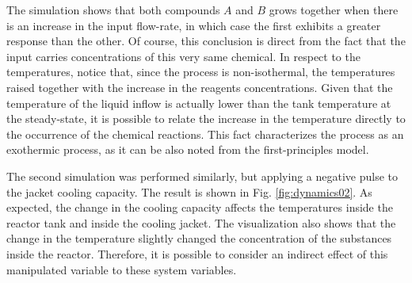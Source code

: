 \documentclass[a4paper,11pt]{book}
\numberwithin{figure}{chapter}
\numberwithin{equation}{chapter}
\numberwithin{table}{chapter}
\theoremstyle{definition}
\begin{document}
The simulation shows that both compounds $A$ and $B$ grows together when there is an increase in the input flow-rate, in which case the first exhibits a greater response than the other. Of course, this conclusion is direct from the fact that the input carries concentrations of this very same chemical. In respect to the temperatures, notice that, since the process is non-isothermal, the temperatures raised together with the increase in the reagents concentrations. Given that the temperature of the liquid inflow is actually lower than the tank temperature at the steady-state, it is possible to relate the increase in the temperature directly to the occurrence of the chemical reactions. This fact characterizes the process as an exothermic process, as it can be also noted from the first-principles model.

The second simulation was performed similarly, but applying a negative pulse to the jacket cooling capacity. The result is shown in Fig. \ref{fig:dynamics02}. As expected, the change in the cooling capacity affects the temperatures inside the reactor tank and inside the cooling jacket. The visualization also shows that the change in the temperature slightly changed the concentration of the substances inside the reactor. Therefore, it is possible to consider an indirect effect of this manipulated variable to these system variables.
\end{document}
